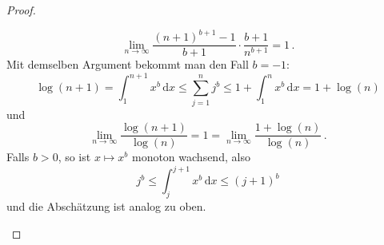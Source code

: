 \documentclass[ngerman,a4paper,11pt]{scrartcl}
\newcommand{\dvar}[1]{\,\mathrm{d}#1}
\begin{document}
\begin{proof}
\begin{thmlist}
\begin{equation*}
 \lim_{n\to\infty} \frac{(n+1)^{b+1}-1}{b+1}\cdot\frac{b+1}{n^{b+1}}=1\,.
\end{equation*}
Mit demselben Argument bekommt man den Fall $b=-1$:
\begin{equation*}
   \log(n+1)=\int_1^{n+1}x^b\dvar{x}\leq\sum_{j=1}^nj^b\leq 1+\int_1^nx^b\dvar{x}=1+\log(n)
\end{equation*}
und
\begin{equation*}
 \lim_{n\to\infty}\frac{\log(n+1)}{\log(n)} = 1 = \lim_{n\to\infty}\frac{1+\log(n)}{\log(n)}\,.
\end{equation*}
  Falls $b>0$, so ist $x\mapsto x^b$ monoton wachsend, also
  \begin{equation*}
   j^b\leq\int_j^{j+1}x^b\dvar{x}\leq (j+1)^b
  \end{equation*}
  und die Abschätzung ist analog zu oben.
  \end{thmlist}
\end{proof}
\end{document}
